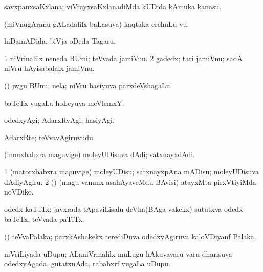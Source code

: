 \bentry
{} 
\gl{\nA}
\expl{}
\bmng
savxpanxsaKxlana; viVrayxsaKxlanadiMda kUDida kAmuka kanasu. 
\emng
\eentry

\bentry
{} 
\gl{\nA}
\expl{}
\bmng
(miVnugAranu gALadalilx baLasuva) kaqtaka erehuLu \mo vu. 
\emng
\eentry

\bentry
{} 
\gl{\nA}
\expl{}
\bmng
hiDamADida, biVja oDeda Tagaru. 
\emng
\eentry

\bentry
{} 
\gl{\nA}
\expl{}
\bmng
\bnum
\num{1} niVrinalilx neneda BUmi; teVvada jamiVnu. 
\num{2} gadedx; tari jamiVnu; sadA niVru hAyisabalalx jamiVnu. 
\enum
\emng
\eentry

\bentry
{} 
\gl{\nA}
\expl{}
\bmng
(\bava) jwgu BUmi, nela; niVru basiyuva parxdeVshagaLu. 
\emng
\eentry

\bentry
{} 
\gl{\nA}
\expl{}
\bmng
baTeTx \mo vugaLa hoLeyuva meVlemxY. 
\emng
\eentry

\bentry
{} 
\gl{\kirxvi}
\expl{}
\bmng
odedxyAgi; AdarxRvAgi; hasiyAgi. 
\emng
\eentry

\bentry
{} 
\gl{\nA}
\expl{}
\bmng
AdarxRte; teVvavAgiruvudu. 
\emng
\eentry

\bentry
{} 
\gl{\nA}
\expl{}
\bmng
(inonxbabxra maguvige) moleyUDisuva dAdi; satxnayxdAdi. 
\emng
\eentry

\bentry
{} 
\gl{\sakirx}
\expl{}
\bmng
\bnum
\num{1} (matotxbabxra maguvige) moleyUDisu; satxnayxpAna mADisu; moleyUDisuva dAdiyAgiru. 
\num{2} (\AmA) (magu \mo vanunx asahAyaveMdu BAvisi) atayxMta pirxVtiyiMda noVDiko. 
\enum
\emng
\eentry

\bentry
{} 
\gl{\nA}
\expl{}
\bmng
odedx kaTuTx; javxrada tApaviLisalu deVha(BAga \mo vakekx) sututxva odedx baTeTx, teVvada paTiTx. 
\emng
\eentry

\bentry
{} 
\gl{\nA}
\expl{}
\bmng
(\CA) teVvaPalaka; parxkAshakekx terediDuva odedxyAgiruva kaloVDiyanf Palaka. 
\emng
\eentry

\bentry
{} 
\gl{\nA}
\expl{}
\bmng
niVriLiyada uDupu; ALaniVrinalilx muLugu hAkuvavaru \mo varu dharisuva odedxyAgada, gutatxnAda, rababxrf \mo vugaLa uDupu. 
\emng
\eentry

